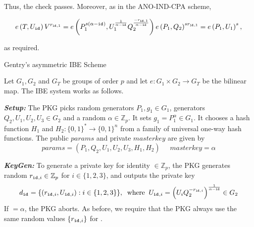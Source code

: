 Thus, the check passes. Moreover, as in the ANO-IND-CPA scheme,

\begin{equation*}
 e \left( T, U_{\mathtt{id}_{}} \right) V^{r_{ \mathtt{id}_{},1}} = e \left( P_1^{s\left( \alpha - \mathtt{id}_{} \right)}, U_1^{\frac{1}{\alpha - \mathtt{id}_{}}} Q_2^{\frac{- r_{\mathtt{id}_{},1}}{\alpha - \mathtt{id}_{}}} \right) e \left( P_1, Q_2 \right)^{s r_{\mathtt{id}_{},1}} = e \left( P_1, U_1\right)^s,
\end{equation*}

as required.

\begin{algorithm}
\caption{Gentry's asymmetric IBE Scheme~\cite{art:Gentry06}}
\label{alg:gentrys_scheme}
Let $G_1 , G_2$ and $G_T$ be groups of order $p$ and let $e : G_1 \times G_2 \rightarrow G_T$ be the bilinear map. The IBE system works as follows.

\begin{description}
\item \textbf{\textit{Setup:}} The PKG picks random generators $P_1, g_1 \in G_1$, generators $Q_2, U_1, U_2, U_3 \in G_2$ and a random $\alpha \in \mathbb{Z}_p$. It sets $g_1 = P_1^{\alpha} \in G_1$. It chooses a hash function $H_1$ and $H_2: \{ 0,1 \}^* \rightarrow \{ 0 , 1 \}^n$ from a family of universal one-way hash functions. The public $params$ and private $masterkey$ are given by
\begin{equation*}
 params = \left( P_1,Q_2,U_1,U_2,U_3,H_1,H_2\right) \; \; \; \; \; masterkey = \alpha
\end{equation*}

\item \textbf{\textit{KeyGen:}} To generate a private key for identity \id{} $\in \mathbb{Z}_p$, the PKG generates random $r_{\mathtt{id}_{},i} \in \mathbb{Z}_p$ for $i \in \{1,2,3\}$, and outputs the private key
\begin{equation*}
 d_{\mathtt{id}_{}} = \{ \left( r_{\mathtt{id}_{},i}, U_{\mathtt{id}_{},i} \right) : i \in \{ 1, 2, 3\}\}, \; \; \textrm{where} \; \; U_{\mathtt{id}_{},i} = \left( U_{i}Q_2^{-r_{\mathtt{id}_{},i}} \right)^{\frac{1}{\alpha-\mathtt{id}_{}}} \in G_2
\end{equation*}
If \id{} $ = \alpha $, the PKG aborts. As before, we require that the PKG always use the same random values $\{r_{\mathtt{id}_{},i}\}$ for \id{}.


\end{description}
\end{algorithm}
